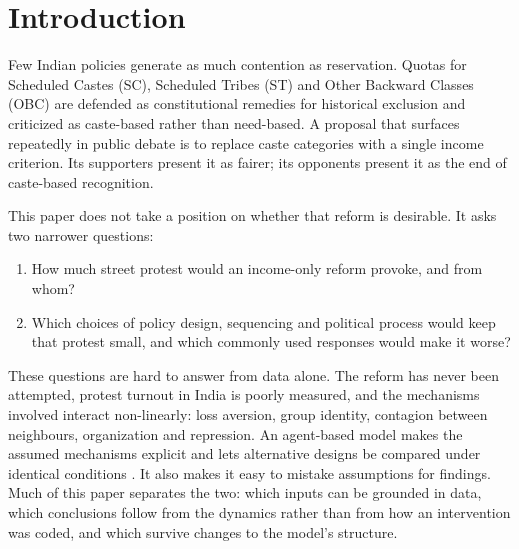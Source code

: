 \documentclass[11pt,a4paper]{article}
\begin{document}

\section{Introduction}

Few Indian policies generate as much contention as reservation. Quotas for Scheduled Castes (SC), Scheduled Tribes (ST) and Other Backward Classes (OBC) are defended as constitutional remedies for historical exclusion and criticized as caste-based rather than need-based. A proposal that surfaces repeatedly in public debate is to replace caste categories with a single income criterion. Its supporters present it as fairer; its opponents present it as the end of caste-based recognition.

This paper does not take a position on whether that reform is desirable. It asks two narrower questions:
\begin{enumerate}[label=\textbf{Q\arabic*.}]
\item How much street protest would an income-only reform provoke, and from whom?
\item Which choices of policy design, sequencing and political process would keep that protest small, and which commonly used responses would make it worse?
\end{enumerate}

These questions are hard to answer from data alone. The reform has never been attempted, protest turnout in India is poorly measured, and the mechanisms involved interact non-linearly: loss aversion, group identity, contagion between neighbours, organization and repression. An agent-based model makes the assumed mechanisms explicit and lets alternative designs be compared under identical conditions \citep{epstein2002,granovetter1978}. It also makes it easy to mistake assumptions for findings. Much of this paper separates the two: which inputs can be grounded in data, which conclusions follow from the dynamics rather than from how an intervention was coded, and which survive changes to the model's structure.
\end{document}

